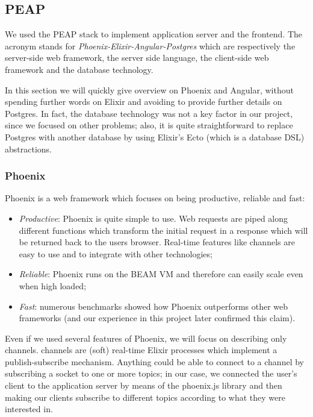 \subsection{PEAP}
We used the PEAP stack to implement application server and the frontend.
The acronym stands for
\textit{Phoenix-Elixir-Angular-Postgres} which are respectively the
server-side web framework, the server side language,
the client-side web framework and the
database technology.

In this section we will quickly give overview on Phoenix and Angular, without
spending further words on Elixir and avoiding to provide further details on
Postgres. In fact, the database technology was not a key factor in our project,
since we focused on other problems; also, it is quite straightforward to
replace Postgres with another database by using Elixir's Ecto (which is a
database DSL) abstractions.

\subsubsection{Phoenix}

Phoenix is a web framework which focuses on being productive,
reliable and fast:

\begin{itemize}
  \item \textit{Productive}: Phoenix is quite simple to use.
    Web requests are piped along different functions which
    transform the initial request in a response which will be returned back to
    the users browser. Real-time features like channels are easy to use and to
    integrate with other technologies;
  \item \textit{Reliable}: Phoenix runs on the BEAM VM and therefore can easily
    scale even when high loaded;
  \item \textit{Fast}: numerous benchmarks showed how Phoenix outperforms other
    web frameworks (and our experience in this project later confirmed this
    claim).
\end{itemize}

Even if we used several features of Phoenix, we will focus on describing only
channels. channels are (soft) real-time Elixir processes which
implement a publish-subscribe mechanism.
Anything could be able to connect to a channel by subscribing a socket to one
or more topics; in our case, we connected the user's client to the application
server by means of the phoenix.js library and then making our clients subscribe
to different topics according to what they were interested in.

